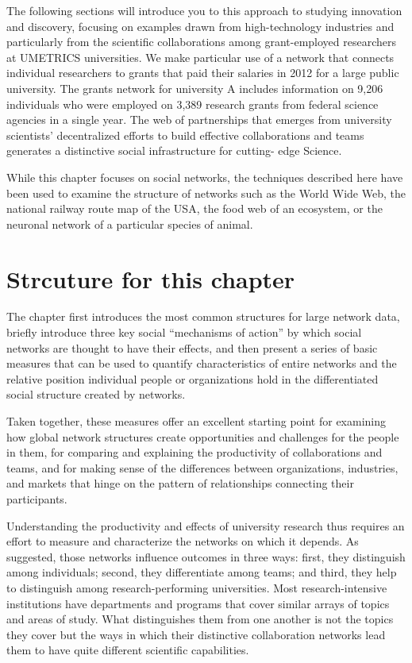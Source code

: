 \documentclass[]{krantz}
\begin{document}
The following sections will introduce you to this approach to studying
innovation and discovery, focusing on examples drawn from
high-technology industries and particularly from the scientific
collaborations among grant-employed researchers at UMETRICS
universities. We make particular use of a network that connects
individual researchers to grants that paid their salaries in 2012 for a
large public university. The grants network for university A includes
information on 9,206 individuals who were employed on 3,389 research
grants from federal science agencies in a single year. The web of
partnerships that emerges from university scientists' decentralized
efforts to build effective collaborations and teams generates a
distinctive social infrastructure for cutting- edge Science.

While this chapter focuses on social networks, the techniques described
here have been used to examine the structure of networks such as the
World Wide Web, the national railway route map of the USA, the food web
of an ecosystem, or the neuronal network of a particular species of
animal.

\section{Strcuture for this chapter}\label{strcuture-for-this-chapter}

The chapter first introduces the most common structures for large
network data, briefly introduce three key social ``mechanisms of
action'' by which social networks are thought to have their effects, and
then present a series of basic measures that can be used to quantify
characteristics of entire networks and the relative position individual
people or organizations hold in the differentiated social structure
created by networks.

Taken together, these measures offer an excellent starting point for
examining how global network structures create opportunities and
challenges for the people in them, for comparing and explaining the
productivity of collaborations and teams, and for making sense of the
differences between organizations, industries, and markets that hinge on
the pattern of relationships connecting their participants.

Understanding the productivity and effects of university research thus
requires an effort to measure and characterize the networks on which it
depends. As suggested, those networks influence outcomes in three ways:
first, they distinguish among individuals; second, they differentiate
among teams; and third, they help to distinguish among
research-performing universities. Most research-intensive institutions
have departments and programs that cover similar arrays of topics and
areas of study. What distinguishes them from one another is not the
topics they cover but the ways in which their distinctive collaboration
networks lead them to have quite different scientific capabilities.
\end{document}
